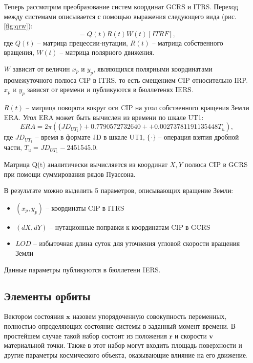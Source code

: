 Теперь рассмотрим преобразование систем координат GCRS и ITRS.
Переход между системами описывается с помощью выражения следующего вида (рис. \ref{fig:qrw}):
\begin{equation*}
    [GCRF] = Q(t) R(t) W (t) [ITRF],
\end{equation*}
где $Q(t)$ -- матрица прецессии-нутации, $R(t)$ -- матрица собственного вращения, 
$W(t)$ -- матрица полярного движения.

$W$ зависит от величин $x_p$ и $y_p$, являющихся полярными координатами промежуточного
полюса CIP в ITRS, то есть смещением CIP относительно IRP. $x_p$ и $y_p$ зависят от времени
и публикуются в бюллетенях IERS.

$R(t)$ -- матрица поворота вокруг оси CIP на угол собственного вращения Земли ERA.
Угол ERA может быть вычислен из времени по шкале UT1:
\begin{equation*}
    ERA = 2 \pi (\{JD_{UT_1}\} + 0.7790572732640 + + 0.00273781191135448 T_u),
\end{equation*}
где $JD_{UT_1}$ -- время в формате JD в шкале UT1, $\{\cdot\}$ -- операция взятия дробной части,
$T_u = JD_{UT_1} - 2451545.0$.

Матрица Q(t) аналитически вычисляется из координат $X, Y$ полюса CIP в GCRS при помощи
суммирования рядов Пуассона.

В результате можно выделить 5 параметров, описывающих вращение Земли:
\begin{itemize}
    \item $(x_p, y_p)$ -- координаты CIP в ITRS
    \item $(dX, dY)$ -- нутационные поправки к координатам CIP в GCRS
    \item $LOD$ -- избыточная длина суток для уточнения угловой скорости вращения Земли
\end{itemize}

Данные параметры публикуются в бюллетени IERS.

\subsection{Элементы орбиты}
Вектором состояния $\mathbf{x}$ назовем упорядоченную совокупность переменных, полностью определяющих состояние системы в заданный момент времени.
В простейшем случае такой набор состоит из положения $\mathbf{r}$ и скорости $\mathbf{v}$ материальной точки. 
Также в этот набор могут входить площадь поверхности и другие параметры космического объекта, оказывающие влияние на его движение.

